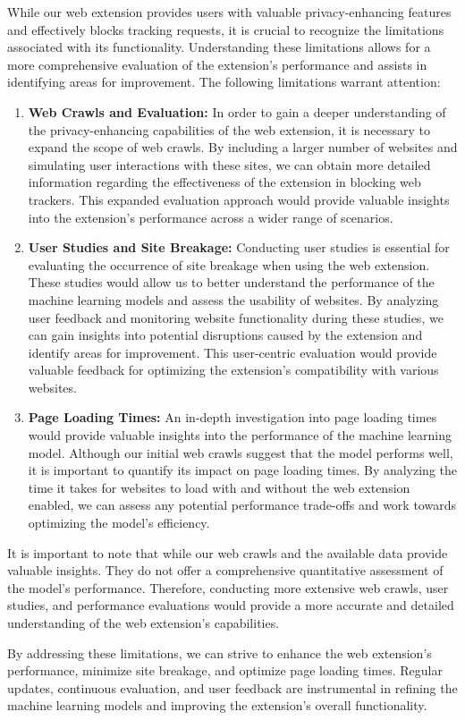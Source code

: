 While our web extension provides users with valuable privacy-enhancing features and effectively blocks tracking requests,
it is crucial to recognize the limitations associated with its functionality. Understanding these limitations allows for a more
comprehensive evaluation of the extension's performance and assists in identifying areas for improvement. The following limitations
warrant attention:
\begin{enumerate}
  \item{
    \textbf{Web Crawls and Evaluation:} In order to gain a deeper understanding of the privacy-enhancing capabilities
  of the web extension, it is necessary to expand the scope of web crawls. By including a larger number of websites and
simulating user interactions with these sites, we can obtain more detailed information regarding the effectiveness of the
extension in blocking web trackers. This expanded evaluation approach would provide valuable insights into the extension's
performance across a wider range of scenarios.}
  \item{
    \textbf{User Studies and Site Breakage:} Conducting user studies is essential for evaluating the occurrence
    of site breakage when using the web extension. These studies would allow us to better understand the performance
    of the machine learning models and assess the usability of websites. By analyzing user feedback and monitoring website
    functionality during these studies, we can gain insights into potential disruptions caused by the extension and identify
    areas for improvement. This user-centric evaluation would provide valuable feedback for optimizing the extension's compatibility
    with various websites.
    }
  \item{
    \textbf{Page Loading Times:} An in-depth investigation into page loading times would provide valuable insights into the
    performance of the machine learning model. Although our initial web crawls suggest that the model performs well, it is
    important to quantify its impact on page loading times. By analyzing the time it takes for websites to load with and without
    the web extension enabled, we can assess any potential performance trade-offs and work towards optimizing the model's efficiency.
    }
\end{enumerate}

It is important to note that while our web crawls and the available data provide valuable insights. They do not offer a 
comprehensive quantitative assessment of the model's performance. Therefore, conducting more extensive web crawls, user studies,
and performance evaluations would provide a more accurate and detailed understanding of the web extension's capabilities.

By addressing these limitations, we can strive to enhance the web extension's performance, minimize site breakage, and optimize
page loading times. Regular updates, continuous evaluation, and user feedback are instrumental in refining the machine learning models
and improving the extension's overall functionality.

